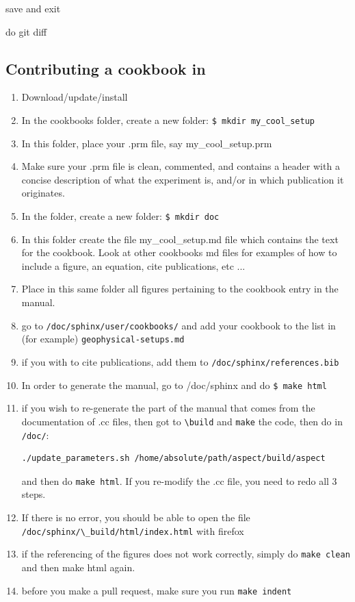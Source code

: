 save and exit

do git diff

\newpage




\newpage

\subsection{Contributing a cookbook in \aspect}

\begin{enumerate}
\item Download/update/install \aspect 
\item In the cookbooks folder, create a new folder: \verb'$ mkdir my_cool_setup'
\item In this folder, place your .prm file, say my\_cool\_setup.prm
\item Make sure your .prm file is clean, commented, and contains a header with a concise
description of what the experiment is, and/or in which publication it originates.
\item In the folder, create a new folder:  \verb'$ mkdir doc'
\item In this folder create the file my\_cool\_setup.md file which contains the 
text for the cookbook. Look at other cookbooks md files for examples of how 
to include a figure, an equation, cite publications, etc ...
\item Place in this same folder all figures pertaining 
to the cookbook entry in the manual. 
\item go to \verb'/doc/sphinx/user/cookbooks/' and add your cookbook to the list in 
(for example) \verb'geophysical-setups.md'
\item if you with to cite publications, add them to \verb'/doc/sphinx/references.bib'
\item In order to generate the manual, go to /doc/sphinx and do \verb"$ make html"

\item if you wish to re-generate the part of the manual that comes from the documentation
of .cc files, then got to \verb'\build' and \verb'make' the code, then do in \verb'/doc/': 
\begin{verbatim}
./update_parameters.sh /home/absolute/path/aspect/build/aspect
\end{verbatim}
and then do \verb'make html'. If you re-modify the .cc file, you need to redo all 3 steps.

\item If there is no error, you should be able to open the file \verb'/doc/sphinx/\_build/html/index.html'
with firefox
\item if the referencing of the figures does not work correctly, simply do 
\verb'make clean' and then make html again.
\item before you make a pull request, make sure you run \verb'make indent'
\end{enumerate}



